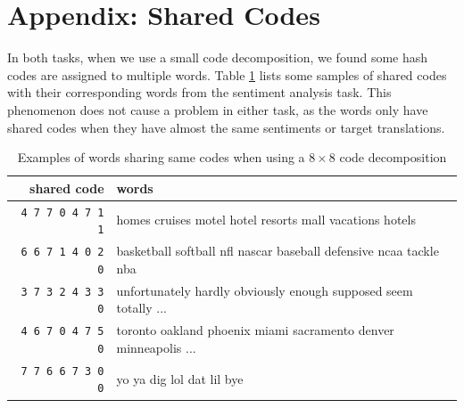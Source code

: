 \documentclass{article} %
\begin{document}



\clearpage
\appendix

\section{Appendix: Shared Codes}

In both tasks, when we use a small code decomposition, we found some hash codes are assigned to multiple words. Table \ref{table:shared_codes} lists some samples of shared codes with their corresponding words from the sentiment analysis task. This phenomenon does not cause a problem in either task, as the words only have shared codes when they have almost the same sentiments or target translations. 



\begin{table}[h]
\begin{center}
    \begin{tabular}{r|l}
    \hline \hline
    {\bf shared code}  & {\bf words}  \\
    \hline
    \texttt{4 7 7 0 4 7 1 1} & homes cruises motel hotel resorts mall vacations hotels\\
    \texttt{6 6 7 1 4 0 2 0} & basketball softball nfl nascar baseball defensive ncaa tackle nba\\
    \texttt{3 7 3 2 4 3 3 0} & unfortunately hardly obviously enough supposed seem totally ...\\
    \texttt{4 6 7 0 4 7 5 0} & toronto oakland phoenix miami sacramento denver minneapolis ...\\
    \texttt{7 7 6 6 7 3 0 0} & yo ya dig lol dat lil bye\\
    \hline \hline
    \end{tabular}
    \caption{Examples of words sharing same codes when using a $8 \times 8$ code decomposition}
    \label{table:shared_codes}
\end{center}
\end{table}
\end{document}
